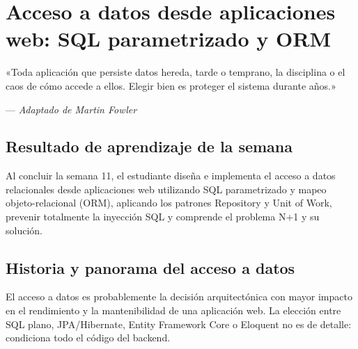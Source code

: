 \chapter{Acceso a datos desde aplicaciones web: SQL parametrizado y ORM}
\label{cap:semana11}

\epigraph{«Toda aplicación que persiste datos hereda, tarde o
temprano, la disciplina o el caos de cómo accede a ellos. Elegir bien
es proteger el sistema durante años.»}{--- \textit{Adaptado de Martin Fowler}}

\section*{Resultado de aprendizaje de la semana}
Al concluir la semana 11, el estudiante diseña e implementa el acceso a
datos relacionales desde aplicaciones web utilizando SQL parametrizado
y mapeo objeto-relacional (ORM), aplicando los patrones Repository y
Unit of Work, prevenir totalmente la inyección SQL y comprende el
problema N+1 y su solución.

\section{Historia y panorama del acceso a datos}

El acceso a datos es probablemente la decisión arquitectónica
con mayor impacto en el rendimiento y la mantenibilidad de una
aplicación web. La elección entre SQL plano, JPA/Hibernate, Entity
Framework Core o Eloquent no es de detalle: condiciona todo el código
del backend.


